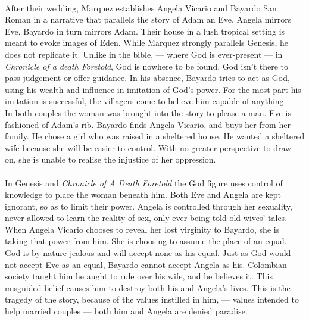 \documentclass[11pt,a4wide]{article}
\begin{document}

%
\paragraph{}After their wedding, Marquez establishes Angela Vicario and Bayardo 
San Roman in a narrative that parallels the story of Adam an Eve. Angela mirrors
Eve, Bayardo in turn mirrors Adam. Their house in a lush tropical setting is 
meant to evoke images of Eden. While Marquez strongly parallels Genesis,
he does not replicate it. Unlike in the bible, --- where God is ever-present
--- in \emph{Chronicle of a death Foretold}, God is nowhere to be found. God 
isn't there to pass judgement or offer guidance. In his absence, Bayardo tries
to act as God, using his wealth and influence in imitation of God's power.
For the most part his imitation is successful,
the villagers come to believe him capable of anything.  
\cite[pg.~27]{chronicle}\\


In both couples the woman was brought into the story to please a man. Eve is
fashioned of Adam's rib. Bayardo finds Angela Vicario, and buys her from her
family. He chose a girl who was raised in a sheltered house. He wanted a 
sheltered wife because she will be easier to control. With no greater perspective
to draw on, she is unable to realise the injustice of her oppression. \cite[pg.~34]{chronicle} 

\paragraph{}In Genesis and \emph{Chronicle of A Death Foretold} the God figure
uses control of knowledge to place the woman beneath him. Both Eve and Angela
are kept ignorant, so as to limit their power. Angela is controlled through
her sexuality, never allowed to learn the reality of sex, only ever
being told old wives' tales. When Angela Vicario chooses to reveal her lost 
virginity to Bayardo, she is taking that power from him. She is choosing to
assume the place of an equal. God is by nature jealous 
\cite[Exodus 20:50]{bible} and will accept none as his equal. Just as God would
not accept Eve as an equal, Bayardo cannot accept Angela as his.
Colombian society taught him he aught to rule over his wife, and he believes it. This misguided belief
causes him to destroy both his and Angela's lives. This is the tragedy of the
story, because of the values instilled in him, --- values intended to help
married couples --- both him and Angela are denied paradise.
\end{document}
